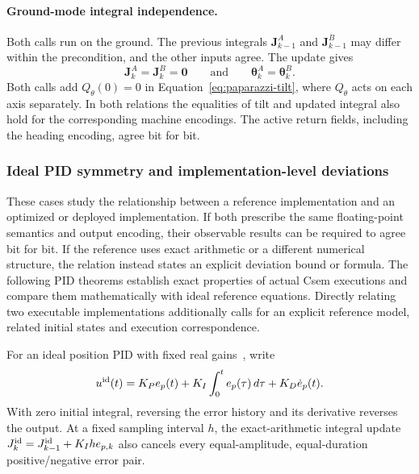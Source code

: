 \documentclass[manuscript, screen, review]{acmart}
\begin{document}
\paragraph{Ground-mode integral independence.}
Both calls run on the ground. The previous integrals
$\mathbf J_{k-1}^A$ and $\mathbf J_{k-1}^B$ may differ within the
precondition, and the other inputs agree. The update gives
\begin{equation}
\mathbf J_k^A = \mathbf J_k^B = \mathbf 0
\qquad\text{and}\qquad
\boldsymbol{\theta}_k^A = \boldsymbol{\theta}_k^B.
\label{eq:paparazzi-ground-integral}
\end{equation}
Both calls add $Q_\theta(0)=0$ in Equation~\eqref{eq:paparazzi-tilt},
where $Q_\theta$ acts on each axis separately. In both relations the
equalities of tilt and updated integral also hold for the corresponding
machine encodings. The active return fields, including the heading
encoding, agree bit for bit.


\subsubsection{Ideal PID symmetry and implementation-level deviations}
\label{sec:pid-rounding-relations}

These cases study the relationship between a reference implementation
and an optimized or deployed implementation. If both prescribe the same
floating-point semantics and output encoding, their observable results
can be required to agree bit for bit. If the reference uses exact
arithmetic or a different numerical structure, the relation instead
states an explicit deviation bound or formula. The following PID
theorems establish exact properties of actual Csem executions and compare
them mathematically with ideal reference equations. Directly relating
two executable implementations additionally calls for an explicit
reference model, related initial states and execution correspondence.

For an ideal position PID with fixed real gains~\cite[Chapter~10]{AstromMurray2008}, write
\begin{equation}
 u^{\rm id}(t)=K_P e_p(t)+K_I\int_0^t e_p(\tau)\,d\tau
                  +K_D\dot e_p(t).
 \label{eq:pid-ideal}
\end{equation}
With zero initial integral, reversing the error history and its
derivative reverses the output. At a fixed sampling interval $h$, the
exact-arithmetic integral update
$J_k^{\rm id}=J_{k-1}^{\rm id}+K_I h e_{p,k}$ also cancels every
equal-amplitude, equal-duration positive/negative error pair.
\end{document}

